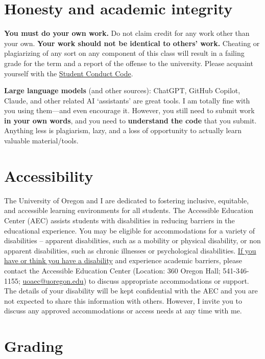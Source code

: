 \documentclass[10pt]{article}
\newcommand{\emf}[1]{\textbf{\textcolor{grass_green}{#1}}}
\begin{document}
\section*{Honesty and academic integrity}

\emf{You must do your own work.} Do not claim credit for any work other than your own. \emf{Your work should not be identical to others' work.} Cheating or plagiarizing of any sort on any component of this class will result in a failing grade for the term and a report of the offense to the university. Please acquaint yourself with the \href{http://studentlife.uoregon.edu}{Student Conduct Code}.

\textbf{Large language models} (and other sources): ChatGPT, GitHub Copilot, Claude, and other related AI `assistants' are great tools. I am totally fine with you using them---and even encourage it. However, you still need to submit work \emf{in your own words}, and you need to \emf{understand the code} that you submit. Anything less is plagiarism, lazy, and a loss of opportunity to actually learn valuable material/tools.

\section*{Accessibility}

The University of Oregon and I are dedicated to fostering inclusive, equitable, and accessible learning environments for all students. The Accessible Education Center (AEC) assists students with disabilities in reducing barriers in the educational experience. You may be eligible for accommodations for a variety of disabilities – apparent disabilities, such as a mobility or physical disability, or non apparent disabilities, such as chronic illnesses or psychological disabilities. \href{https://aec.uoregon.edu/content/what-disability}{If you have or think you have a disability} and experience academic barriers, please contact the Accessible Education Center (Location: 360 Oregon Hall; 541-346-1155; \href{https://aec.uoregon.edu/}{uoaec@uoregon.edu}) to discuss appropriate accommodations or support. The details of your disability will be kept confidential with the AEC and you are not expected to share this information with others. However, I invite you to discuss any approved accommodations or access needs at any time with me.

\section*{Grading}
\end{document}
